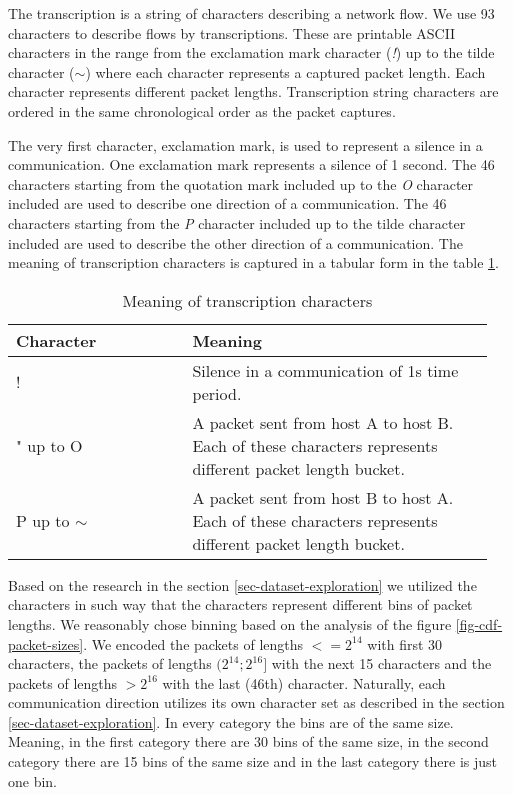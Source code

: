 \documentclass{article}
\begin{document}
The transcription is a string of characters describing a network flow. We use 93 characters to describe flows by transcriptions. These are printable ASCII characters in the range from the exclamation mark character (\textit{!}) up to the tilde character (\textit{$\sim$}) where each character represents a captured packet length. Each character represents different packet lengths. Transcription string characters are ordered in the same chronological order as the packet captures.

The very first character, exclamation mark, is used to represent a silence in a communication. One exclamation mark represents a silence of 1 second. The 46 characters starting from the quotation mark included up to the \textit{O} character included are used to describe one direction of a communication. The 46 characters starting from the \textit{P} character included up to the tilde character included are used to describe the other direction of a communication. The meaning of transcription characters is captured in a tabular form in the table \ref{tab:character-meanings}.

\begin{table}[h!]
\centering
\begin{tabular}{ |p{0.35\linewidth} | p{0.6\linewidth}| }
 \hline
 Character & Meaning \\
 \hline \hline
 ! & Silence in a communication of 1s time period. \\
 \hline
 " up to O & A packet sent from host A to host B. Each of these characters represents different packet length bucket. \\
 \hline
 P up to $\sim$ & A packet sent from host B to host A. Each of these characters represents different packet length bucket. \\
 \hline
\end{tabular}
\caption{Meaning of transcription characters}
\label{tab:character-meanings}
\end{table}

Based on the research in the section \ref{sec-dataset-exploration} we utilized the characters in such way that the characters represent different bins of packet lengths. We reasonably chose binning based on the analysis of the figure \ref{fig-cdf-packet-sizes}. We encoded the packets of lengths $<= 2^{14}$ with first 30 characters, the packets of lengths $(2^{14}; 2^{16}]$ with the next 15 characters and the packets of lengths $> 2^{16}$ with the last (46th) character. Naturally, each communication direction utilizes its own character set as described in the section \ref{sec-dataset-exploration}. In every category the bins are of the same size. Meaning, in the first category there are 30 bins of the same size, in the second category there are 15 bins of the same size and in the last category there is just one bin.
\end{document}
